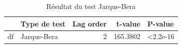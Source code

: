 \begin{table}[!h]
\centering
\caption{Résultat du test Jarque-Bera}
\centering
\begin{tabular}[t]{llrrl}
\toprule
  & Type de test & Lag order & t-value & P-value\\
\midrule
df & Jarque-Bera & 2 & 165.3802 & <2.2e-16\\
\bottomrule
\end{tabular}
\end{table}
